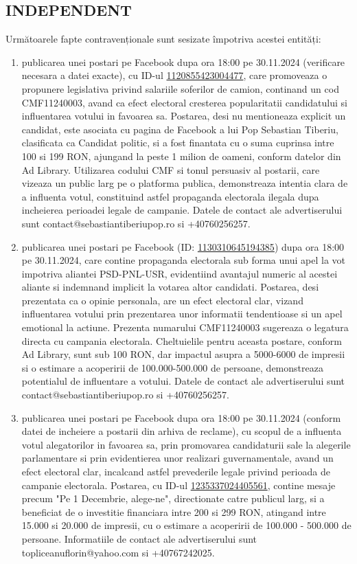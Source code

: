 \documentclass[a4paper,12pt]{article}
\begin{document}
\subsection{INDEPENDENT}
Următoarele fapte contravenționale sunt sesizate împotriva acestei entități:

\begin{enumerate}[leftmargin=*, label=\arabic*.)]
    \item publicarea unei postari pe Facebook dupa ora 18:00 pe 30.11.2024 (verificare necesara a datei exacte), cu ID-ul \href{https://www.facebook.com/ads/library/?id=1120855423004477}{1120855423004477}, care promoveaza o propunere legislativa privind salariile soferilor de camion, continand un cod CMF11240003,  avand ca efect electoral cresterea popularitatii candidatului si influentarea votului in favoarea sa. Postarea, desi nu mentioneaza explicit un candidat, este asociata cu pagina de Facebook a lui Pop Sebastian Tiberiu, clasificata ca Candidat politic, si a fost finantata cu o suma cuprinsa intre 100 si 199 RON, ajungand la peste 1 milion de oameni, conform datelor din Ad Library.  Utilizarea codului CMF si tonul persuasiv al postarii, care vizeaza un public larg pe o platforma publica, demonstreaza intentia clara de a influenta votul, constituind astfel propaganda electorala ilegala dupa incheierea perioadei legale de campanie.  Datele de contact ale advertiserului sunt contact@sebastiantiberiupop.ro si +40760256257.
    \item publicarea unei postari pe Facebook (ID: \href{https://www.facebook.com/ads/library/?id=1130310645194385}{1130310645194385}) dupa ora 18:00 pe 30.11.2024, care contine propaganda electorala sub forma unui apel la vot impotriva aliantei PSD-PNL-USR, evidentiind avantajul numeric al acestei aliante si indemnand implicit la votarea altor candidati. Postarea, desi prezentata ca o opinie personala, are un efect electoral clar, vizand influentarea votului prin prezentarea unor informatii tendentioase si un apel emotional la actiune. Prezenta numarului CMF11240003 sugereaza o legatura directa cu campania electorala.  Cheltuielile pentru aceasta postare, conform Ad Library, sunt sub 100 RON, dar impactul asupra a 5000-6000 de impresii si o estimare a acoperirii de 100.000-500.000 de persoane, demonstreaza potentialul de influentare a votului.  Datele de contact ale advertiserului sunt contact@sebastiantiberiupop.ro si +40760256257.
    \item publicarea unei postari pe Facebook dupa ora 18:00 pe 30.11.2024 (conform datei de incheiere a postarii din arhiva de reclame), cu scopul de a influenta votul alegatorilor in favoarea sa, prin promovarea candidaturii sale la alegerile parlamentare si prin evidentierea unor realizari guvernamentale,  avand un efect electoral clar,  incalcand astfel prevederile legale privind perioada de campanie electorala. Postarea, cu ID-ul \href{https://www.facebook.com/ads/library/?id=1235337024405561}{1235337024405561}, contine mesaje precum "Pe 1 Decembrie, alege-ne",  directionate catre publicul larg,  si a beneficiat de o investitie financiara intre 200 si 299 RON, atingand intre 15.000 si 20.000 de impresii, cu o estimare a acoperirii de 100.000 - 500.000 de persoane.  Informatiile de contact ale advertiserului sunt topliceanuflorin@yahoo.com si +40767242025.

\end{enumerate}
\end{document}
